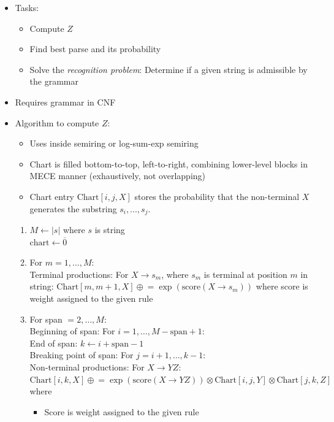 \begin{itemize}
    \item Tasks:
    \begin{itemize}
        \item Compute $Z$
        \item Find best parse and its probability
        \item Solve the \emph{recognition problem}: Determine if a given string is admissible by the grammar
    \end{itemize}
    \item Requires grammar in CNF
    \item Algorithm to compute $Z$:
    \begin{itemize}
        \item Uses inside semiring or log-sum-exp semiring
        \item Chart is filled bottom-to-top, left-to-right, combining lower-level blocks in MECE manner (exhaustively, not overlapping)
        \item Chart entry $\textrm{Chart}[i, j, X]$ stores the probability that the non-terminal $X$ generates the substring $s_i, ..., s_j$.
    \end{itemize}
    \begin{enumerate}
        \item $M \gets |s|$ where $s$ is string\\
        $\textrm{chart} \gets \overline{0}$
        \item For $m = 1, \dots, M$:\\
        Terminal productions: For $X \to s_m$, where $s_m$ is terminal at position $m$ in string: $\textrm{Chart}[m, m+1, X] \mathrel{\oplus}= \exp(\textrm{score}(X \to s_m))$ where score is weight assigned to the given rule
        \item For span $= 2, \dots, M$:\\
        Beginning of span: For $i = 1, \dots, M-\textrm{span}+1$:\\
        End of span: $k \gets i + \textrm{span} - 1$\\
        Breaking point of span: For $j = i+1, \dots, k-1$:\\
        Non-terminal productions: For $X \to Y Z$:
        $\textrm{Chart}[i, k, X] \mathrel{\oplus}= \exp(\textrm{score}(X \to Y Z)) \otimes \textrm{Chart}[i, j, Y] \otimes \textrm{Chart}[j, k, Z]$ where
        \begin{itemize}
            \item Score is weight assigned to the given rule

\end{itemize}
\end{enumerate}
\end{itemize}
